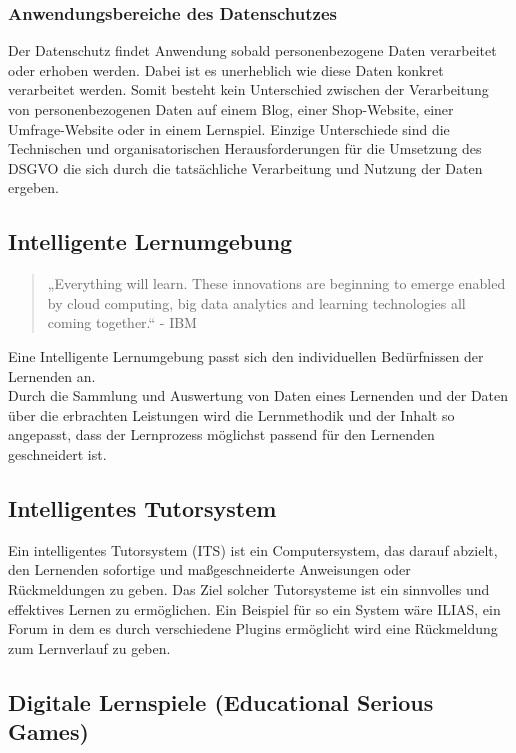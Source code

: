 \documentclass[a4paper, 12pt]{article}
\begin{document}
\subsubsection{Anwendungsbereiche des Datenschutzes}
Der Datenschutz findet Anwendung sobald personenbezogene Daten verarbeitet oder erhoben werden. Dabei ist es unerheblich wie diese Daten konkret verarbeitet werden. Somit besteht kein Unterschied zwischen der Verarbeitung von personenbezogenen Daten auf einem Blog, einer Shop-Website, einer Umfrage-Website oder in einem Lernspiel. Einzige Unterschiede sind die Technischen und organisatorischen Herausforderungen für die Umsetzung des DSGVO die sich durch die tatsächliche Verarbeitung und Nutzung der Daten ergeben.

\subsection{Intelligente Lernumgebung}
\begin{quote}
	„Everything will learn. These innovations are beginning to emerge enabled by cloud computing, big data analytics and learning technologies all coming together.“ - IBM
\end{quote}
\noindent Eine Intelligente Lernumgebung passt sich den individuellen Bedürfnissen der Lernenden an. \\
Durch die Sammlung und Auswertung von Daten eines Lernenden und der Daten über die erbrachten Leistungen wird die Lernmethodik und der Inhalt so angepasst, dass der Lernprozess möglichst passend für den Lernenden geschneidert ist. 

\subsection{Intelligentes Tutorsystem}
Ein intelligentes Tutorsystem (ITS) ist ein Computersystem, das darauf abzielt, den Lernenden sofortige und maßgeschneiderte Anweisungen oder Rückmeldungen zu geben. Das Ziel solcher Tutorsysteme ist ein sinnvolles und effektives Lernen zu ermöglichen. Ein Beispiel für so ein System wäre ILIAS, ein Forum in dem es durch verschiedene Plugins ermöglicht wird eine Rückmeldung zum Lernverlauf zu geben.


\subsection{Digitale Lernspiele (Educational Serious Games)}
\end{document}

